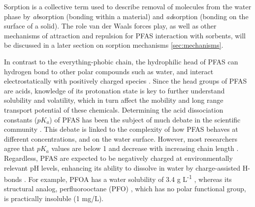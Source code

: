 Sorption is a collective term used to describe removal of molecules from the water phase by \textit{ab}sorption (bonding within a material) and \textit{ad}sorption (bonding on the surface of a solid). The role van der Waals forces play, as well as other mechanisms of attraction and repulsion for PFAS interaction with sorbents, will be discussed in a later section on sorption mechanisms \cref{sec:mechanisms}. 

In contrast to the everything-phobic chain, the hydrophilic head of PFAS can hydrogen bond to other polar compounds such as water, and interact electrostatically with positively charged species \citep{sigmund2022sorption}. Since the head groups of PFAS are acids, knowledge of its protonation state is key to further understand solubility and volatility, which in turn affect the mobility and long range transport potential of these chemicals. Determining the acid dissociation constants (\(pK_a\)) of PFAS has been the subject of much debate in the scientific community \citep{Goss2009comment}. This debate is linked to the complexity of how PFAS behaves at different concentrations, and on the water surface. However, most researchers agree that \(pK_a\) values are below 1 and decrease with increasing chain length \citep{wang2011physchem,Reemtsma2016}. Regardless, PFAS are expected to be negatively charged at environmentally relevant pH levels, enhancing its ability to dissolve in water by charge-assisted H-bonds \citep{Reemtsma2016}. For example, PFOA has a water solubility of 3.4 g L\textsuperscript{-1} \citep{PFOA}, whereas its structural analog, perfluorooctane (PFO) \citep{PFO}, which has no polar functional group, is practically insoluble (1 mg/L). 

